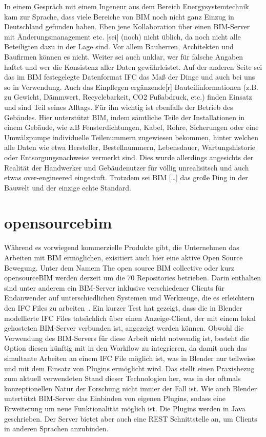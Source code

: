 In einem Gespräch mit einem Ingeneur aus dem Bereich \glqq{}Energysystemtechnik\grqq{} kam zur Sprache, dass viele Bereiche von BIM noch nicht ganz Einzug in Deutschland gefunden haben.
Eben jene \glqq{}Kollaboration über einen BIM-Server mit Änderungsmanagement etc. [sei] (noch) nicht üblich, da noch nicht alle Beteiligten dazu in der Lage sind. Vor allem Bauherren, Architekten und Baufirmen können es nicht\grqq{}.
Weiter sei \glqq{}auch unklar, wer für falsche Angaben haftet und wer die Konsistenz aller Daten gewährleistet\grqq{}.
Auf der anderen Seite sei \glqq{}das im BIM festegelegte Datenformat IFC das Maß der Dinge und auch bei uns so in Verwendung\grqq{}.
Auch das Einpflegen \glqq{}ergänzende[r] Bauteilinformationen (z.B. zu Gewicht, Dämmwert, Recyclebarkeit, CO2 Fußabdruck, etc.)\grqq{} finden Einsatz und sind Teil seines Alltags.
Für ihn wichtig ist ebenfalls der Betrieb des Gebäudes.
Hier unterstützt BIM, indem sämtliche Teile der Installationen in einem Gebäude, wie z.B Fensterdichtungen, Kabel, Rohre, Sicherungen oder eine Umwälzpumpe individuelle Teilenummern zugewiesen bekommen, hinter welchen alle Daten wie etwa Hersteller, Bestellnummern, Lebensdauer, Wartungshistorie oder Entsorgungsnachweise vermerkt sind.
Dies wurde allerdings \glqq{}angesichts der Realität der Handwerker und Gebäudenutzer für völlig unrealisitsch und auch etwas over-engineered\grqq{} eingestuft.
Trotzdem sei \glqq{}BIM [\ldots] das große Ding in der Bauwelt und der einzige echte Standard\grqq{}.

\section{opensourcebim}
Während es vorwiegend kommerzielle Produkte gibt, die Unternehmen das Arbeiten mit BIM ermöglichen, exisitiert auch hier eine aktive Open Source Bewegung.
Unter dem Namem \glqq{}The open source BIM collective\grqq{} oder kurz \glqq{}opensourceBIM\grqq{} werden derzeit um die 70 Repositories betrieben.
Darin enthalten sind unter anderem ein BIM-Server inklusive verschiedener Clients für Endanwender auf unterschiedlichen Systemen und Werkzeuge, die es erleichtern den IFC Files zu arbeiten~\cite{Theopens96:online}.
Ein kurzer Test hat gezeigt, dass die in Blender modellierte IFC Files tatsächlich über einen \glqq{}Anzeige-Client\grqq{}, der mit einem lokal gehosteten BIM-Server verbunden ist, angezeigt werden können.
Obwohl die Verwendung des BIM-Servers für diese Arbeit nicht notwendig ist, besteht die Option diesen künftig mit in den Workflow zu integrieren, da damit auch das simultante Arbeiten an einem IFC File möglich ist, was in Blender nur teilweise und mit dem Einsatz von Plugins ermöglicht wird.
Das stellt einen Praxisbezug zum aktuell verwendeten Stand dieser Technologien her, was in der oftmals konzeptionellen Natur der Forschung nicht immer der Fall ist.
Wie auch Blender untertützt BIM-Server das Einbinden von eigenen Plugins, sodass eine Erweiterung um neue Funktionalität möglich ist.
Die Plugins werden in Java geschrieben.
Der Server bietet aber auch eine REST Schnittstelle an, um Clients in anderen Sprachen anzubinden.


